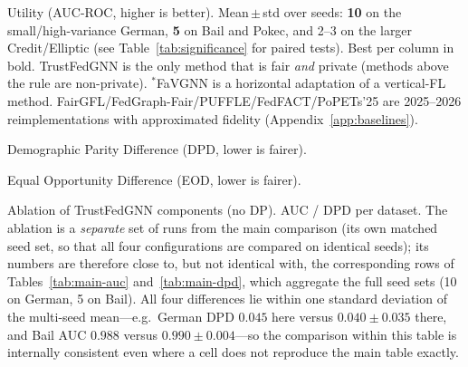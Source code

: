 \documentclass[pdflatex,sn-mathphys-num]{sn-jnl}
\theoremstyle{thmstyleone}%
\theoremstyle{thmstyletwo}%
\theoremstyle{thmstylethree}%
\begin{document}
\clearpage

\begin{table}[htbp]\centering\small
\caption{Utility (AUC-ROC, higher is better). Mean\,$\pm$\,std over seeds:
\textbf{10} on the small/high-variance German, \textbf{5} on Bail and Pokec, and
2--3 on the larger Credit/Elliptic (see Table~\ref{tab:significance} for paired
tests). Best per column in bold. TrustFedGNN is the only method that is
fair \emph{and} private (methods above the rule are non-private).
$^{\ast}$FaVGNN is a horizontal adaptation of a vertical-FL method.
FairGFL/FedGraph-Fair/PUFFLE/FedFACT/PoPETs'25 are 2025--2026 reimplementations
with approximated fidelity (Appendix~\ref{app:baselines}).}
\label{tab:main-auc}
{\footnotesize\setlength{\tabcolsep}{3pt}}
\end{table}

\clearpage

\begin{table}[htbp]\centering\small
\caption{Demographic Parity Difference (DPD, lower is fairer).}
\label{tab:main-dpd}
{\footnotesize\setlength{\tabcolsep}{3pt}}
\end{table}

\clearpage

\begin{table}[htbp]\centering\small
\caption{Equal Opportunity Difference (EOD, lower is fairer).}
\label{tab:main-eod}
{\footnotesize\setlength{\tabcolsep}{3pt}}
\end{table}

\clearpage

\begin{table}[htbp]\centering\small
\caption{Ablation of TrustFedGNN components (no DP). AUC / DPD per dataset.
The ablation is a \emph{separate} set of runs from the main comparison (its own
matched seed set, so that all four configurations are compared on identical
seeds); its numbers are therefore close to, but not identical with, the
corresponding rows of Tables~\ref{tab:main-auc} and~\ref{tab:main-dpd}, which
aggregate the full seed sets (10 on German, 5 on Bail). All four differences
lie within one standard deviation of the multi-seed mean---e.g.\ German DPD
$0.045$ here versus $0.040\!\pm\!0.035$ there, and Bail AUC $0.988$ versus
$0.990\!\pm\!0.004$---so the comparison within this table is internally
consistent even where a cell does not reproduce the main table exactly.}
\label{tab:ablation}

\end{table}
\end{document}
